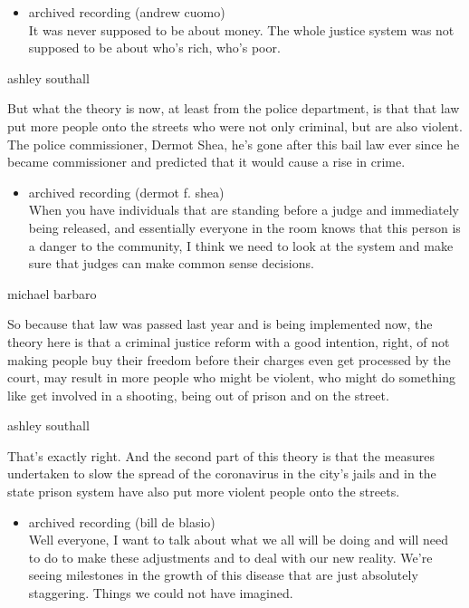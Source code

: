 \begin{itemize}
\tightlist
\item
  archived recording (andrew cuomo)\\
  It was never supposed to be about money. The whole justice system was
  not supposed to be about who's rich, who's poor.
\end{itemize}

ashley southall

But what the theory is now, at least from the police department, is that
that law put more people onto the streets who were not only criminal,
but are also violent. The police commissioner, Dermot Shea, he's gone
after this bail law ever since he became commissioner and predicted that
it would cause a rise in crime.

\begin{itemize}
\tightlist
\item
  archived recording (dermot f. shea)\\
  When you have individuals that are standing before a judge and
  immediately being released, and essentially everyone in the room knows
  that this person is a danger to the community, I think we need to look
  at the system and make sure that judges can make common sense
  decisions.
\end{itemize}

michael barbaro

So because that law was passed last year and is being implemented now,
the theory here is that a criminal justice reform with a good intention,
right, of not making people buy their freedom before their charges even
get processed by the court, may result in more people who might be
violent, who might do something like get involved in a shooting, being
out of prison and on the street.

ashley southall

That's exactly right. And the second part of this theory is that the
measures undertaken to slow the spread of the coronavirus in the city's
jails and in the state prison system have also put more violent people
onto the streets.

\begin{itemize}
\tightlist
\item
  archived recording (bill de blasio)\\
  Well everyone, I want to talk about what we all will be doing and will
  need to do to make these adjustments and to deal with our new reality.
  We're seeing milestones in the growth of this disease that are just
  absolutely staggering. Things we could not have imagined.
\end{itemize}

